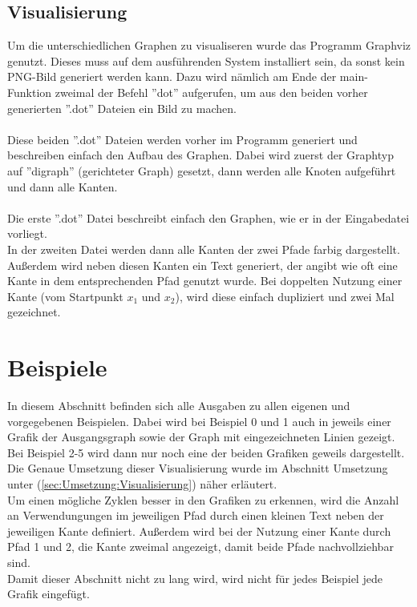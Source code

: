 \documentclass[a4paper,10pt,ngerman]{scrartcl}
\begin{document}
    \subsection{Visualisierung\label{sec:Umsetzung:Visualisierung}}
      Um die unterschiedlichen Graphen zu visualiseren wurde das Programm Graphviz genutzt. Dieses muss auf dem ausführenden System installiert sein, da sonst kein PNG-Bild generiert werden kann. Dazu wird nämlich am Ende der main-Funktion zweimal der Befehl ''dot'' aufgerufen, um aus den beiden vorher generierten ''.dot'' Dateien ein Bild zu machen.\\\\
      Diese beiden ''.dot'' Dateien werden vorher im Programm generiert und beschreiben einfach den Aufbau des Graphen. Dabei wird zuerst der Graphtyp auf ''digraph'' (gerichteter Graph) gesetzt, dann werden alle Knoten aufgeführt und dann alle Kanten.\\\\
      Die erste ''.dot'' Datei beschreibt einfach den Graphen, wie er in der Eingabedatei vorliegt.\\
      In der zweiten Datei werden dann alle Kanten der zwei Pfade farbig dargestellt. Außerdem wird neben diesen Kanten ein Text generiert, der angibt wie oft eine Kante in dem entsprechenden Pfad genutzt wurde. Bei doppelten Nutzung einer Kante (vom Startpunkt $x_1$ und $x_2$), wird diese einfach dupliziert und zwei Mal gezeichnet.

  \section{Beispiele\label{sec:Beispiele}}
    In diesem Abschnitt befinden sich alle Ausgaben zu allen eigenen und vorgegebenen Beispielen. Dabei wird bei Beispiel 0 und 1 auch in jeweils einer Grafik der Ausgangsgraph sowie der Graph mit eingezeichneten Linien gezeigt. Bei Beispiel 2-5 wird dann nur noch eine der beiden Grafiken geweils dargestellt. Die Genaue Umsetzung dieser Visualisierung wurde im Abschnitt Umsetzung unter  (\cref{sec:Umsetzung:Visualisierung}) näher erläutert.
    \\
    Um einen mögliche Zyklen besser in den Grafiken zu erkennen, wird die Anzahl an Verwendungungen im jeweiligen Pfad durch einen kleinen Text neben der jeweiligen Kante definiert. Außerdem wird bei der Nutzung einer Kante durch Pfad 1 und 2, die Kante zweimal angezeigt, damit beide Pfade nachvollziehbar sind.
    \\
    Damit dieser Abschnitt nicht zu lang wird, wird nicht für jedes Beispiel jede Grafik eingefügt.
\end{document}
